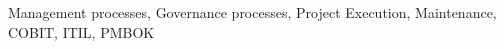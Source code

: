 
% 
% 

\begin{keywords}

Management processes, Governance processes, Project Execution, Maintenance, COBIT, ITIL, PMBOK

\end{keywords}